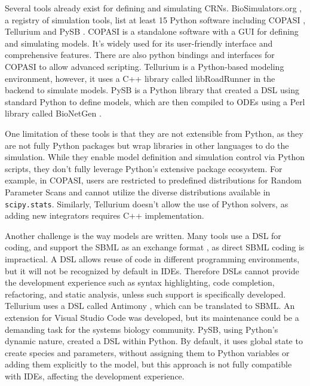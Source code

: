 \documentclass[
  letterpaper,
  DIV=11,
  numbers=noendperiod]{scrartcl}
\begin{document}
Several tools already exist for defining and simulating \acp{CRN}.
BioSimulators.org \cite{shaikhBioSimulatorsCentralRegistry2022}, a registry of simulation tools,
list at least 15 Python software including COPASI \cite{hoopsCOPASICOmplexPAthway2006},
Tellurium \cite{choiTelluriumExtensiblePythonbased2018} and PySB \cite{lopezProgrammingBiologicalModels2013}. COPASI is a
standalone software with a \ac{GUI} for defining and simulating models. It's
widely used for its user-friendly interface and comprehensive features.
There are also python bindings and interfaces for COPASI to allow
advanced scripting. Tellurium is a Python-based modeling environment,
however, it uses a C++ library called libRoadRunner in the backend to
simulate models. PySB is a Python library that created a \ac{DSL} using
standard Python to define models, which are then compiled to \acp{ODE} using a
Perl library called BioNetGen \cite{harrisBioNetGenAdvancesRulebased2016}.

One limitation of these tools is that they are not extensible from
Python, as they are not fully Python packages but wrap libraries in
other languages to do the simulation. While they enable model definition
and simulation control via Python scripts, they don't fully leverage
Python's extensive package ecosystem. For example, in COPASI, users are
restricted to predefined distributions for Random Parameter Scans and
cannot utilize the diverse distributions available in
\texttt{scipy.stats}. Similarly, Tellurium doesn't allow the use of
Python solvers, as adding new integrators requires C++ implementation.



Another challenge is the way models are written. Many tools use a \ac{DSL} for coding, and support the
\ac{SBML} as an exchange format \cite{huckaSBMLL3V2}, as
direct \ac{SBML} coding is impractical. A \ac{DSL} allows reuse of code in
different programming environments, but it will not be recognized by
default in \acp{IDE}. Therefore \acp{DSL}
cannot provide the development experience such as syntax highlighting,
code completion, refactoring, and static analysis, unless such support
is specifically developed. Tellurium uses a
\ac{DSL} called Antimony \cite{smithAntimonyModularModel2009}, which can be translated to
\ac{SBML}. An extension for Visual Studio Code was developed, but its
maintenance could be a demanding task for the systems biology community.
PySB, using Python's dynamic nature, created a \ac{DSL} within Python. By
default, it uses global state to create species and parameters, without
assigning them to Python variables or adding them explicitly to the
model, but this approach is not fully compatible with \acp{IDE}, affecting
the development experience.
\end{document}
